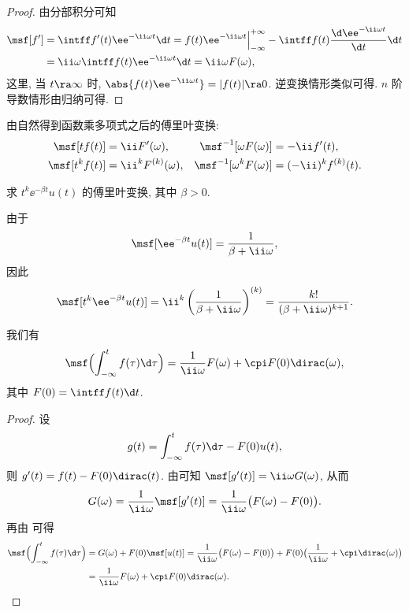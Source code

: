 \begin{proof}
  由分部积分可知
  \begin{align*}
    \msf[f']
    &=\intff f'(t)\ee^{-\ii \omega t}\d t
    =f(t)\ee^{-\ii \omega t}\Big|_{-\infty}^{+\infty}-\intff f(t)\frac{\d \ee^{-\ii \omega t}}{\d t}\d t\\
    &=\ii \omega \intff f(t)\ee^{-\ii \omega t}\d t
    =\ii \omega F(\omega),
  \end{align*}
  这里, 当 $t\ra \infty$ 时, $\abs{f(t)\ee^{-\ii\omega t}}=|f(t)|\ra 0$.
  逆变换情形类似可得.
  $n$ 阶导数情形由归纳可得.
\end{proof}

由\thmFDif 自然得到函数乘多项式之后的傅里叶变换:
\begin{align*}
  \msf[tf(t)]&=\ii F'(\omega),&
  \msf^{-1}[\omega F(\omega)]&=-\ii f'(t),\\
  \msf[t^kf(t)]&=\ii^kF^{(k)}(\omega),&
  \msf^{-1}[\omega^kF(\omega)]&=(-\ii )^kf^{(k)}(t).
\end{align*}

\begin{example}\label{exam:fourier-transform-power-rational}
  求 $t^k \ee^{-\beta t}u(t)$ 的傅里叶变换, 其中 $\beta>0$.
\end{example}

\begin{solution}
  由于
  \[
    \msf[\ee^{-\beta t}u(t)]=\frac{1}{\beta+\ii \omega},
  \]
  因此
  \[
    \msf[t^k\ee^{-\beta t}u(t)]=\ii^k\left(\frac1{\beta+\ii \omega}\right)^{(k)}
    =\frac{k!}{(\beta+\ii \omega)^{k+1}}.
  \]
\end{solution}

\begin{theorem}[积分性质]\label{thm:fourier-integral-property}
  我们有
  \[
    \msf\Bigl(\int_{-\infty}^t f(\tau)\d\tau\Bigr)
    =\frac1{\ii \omega}F(\omega)+\cpi F(0)\dirac(\omega),
  \]
  其中 $F(0)=\intff f(t)\d t$.
\end{theorem}

\begin{proof}
  设
  \[
    g(t)=\int_{-\infty}^t f(\tau)\d \tau-F(0)u(t),
  \]
  则 $g'(t)=f(t)-F(0)\dirac(t)$.
  由\thmFDif 可知 $\msf[g'(t)]=\ii \omega G(\omega)$, 从而
  \[
    G(\omega)=\frac1{\ii \omega}\msf[g'(t)]
    =\frac1{\ii \omega}\bigl(F(\omega)-F(0)\bigr).
  \]
  再由 可得
  \begin{align*}
    \msf\Bigl(\int_{-\infty}^t f(\tau)\d\tau\Bigr)
    &=G(\omega)+F(0)\msf[u(t)]
    =\frac1{\ii \omega}\bigl(F(\omega)-F(0)\bigr)+F(0)\bigl(\frac1{\ii \omega}+\cpi\dirac(\omega)\bigr)\\
    &=\frac1{\ii \omega}F(\omega)+\cpi F(0)\dirac(\omega).\qedhere
  \end{align*}
\end{proof}

